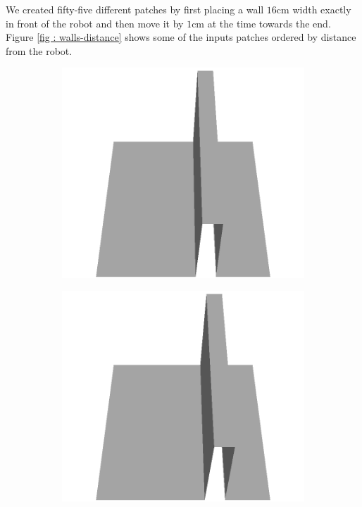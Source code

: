 \documentclass[../document.tex]{subfiles}
\begin{document}
We created fifty-five different patches by first placing a wall $16$cm width exactly in front of the robot and then move it by $1$cm at the time towards the end. Figure \ref{fig : walls-distance} shows some of the inputs patches ordered by distance from the robot. 
\begin{figure}[htbp]
    \centering
    \begin{subfigure}[b]{0.24\linewidth}
    \includegraphics[width=\linewidth]{../img/5/custom_patches/walls_front/all/00-3d.png}
    \end{subfigure}
    \begin{subfigure}[b]{0.24\linewidth}
    \includegraphics[width=\linewidth]{../img/5/custom_patches/walls_front/all/04-3d.png}

\end{subfigure}
\end{figure}
\end{document}
